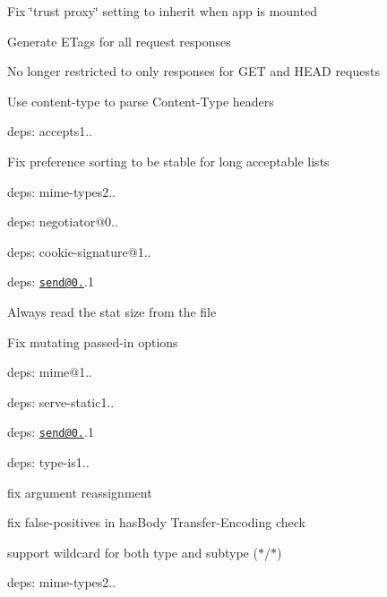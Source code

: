 \begin{DoxyItemize}
\item Fix {\ttfamily \char`\"{}trust proxy\char`\"{}} setting to inherit when app is mounted
\item Generate {\ttfamily E\+Tag}s for all request responses
\begin{DoxyItemize}
\item No longer restricted to only responses for {\ttfamily G\+E\+T} and {\ttfamily H\+E\+A\+D} requests
\end{DoxyItemize}
\item Use {\ttfamily content-\/type} to parse {\ttfamily Content-\/\+Type} headers
\item deps\+: accepts1..
\begin{DoxyItemize}
\item Fix preference sorting to be stable for long acceptable lists
\item deps\+: mime-\/types2..
\item deps\+: negotiator@0..
\end{DoxyItemize}
\item deps\+: cookie-\/signature@1..
\item deps\+: \href{mailto:send@0.12}{\tt send@0.}.1
\begin{DoxyItemize}
\item Always read the stat size from the file
\item Fix mutating passed-\/in {\ttfamily options}
\item deps\+: mime@1..
\end{DoxyItemize}
\item deps\+: serve-\/static1..
\begin{DoxyItemize}
\item deps\+: \href{mailto:send@0.12}{\tt send@0.}.1
\end{DoxyItemize}
\item deps\+: type-\/is1..
\begin{DoxyItemize}
\item fix argument reassignment
\item fix false-\/positives in {\ttfamily has\+Body} {\ttfamily Transfer-\/\+Encoding} check
\item support wildcard for both type and subtype ({\ttfamily $\ast$/$\ast$})
\item deps\+: mime-\/types2..
\end{DoxyItemize}
\end{DoxyItemize}

